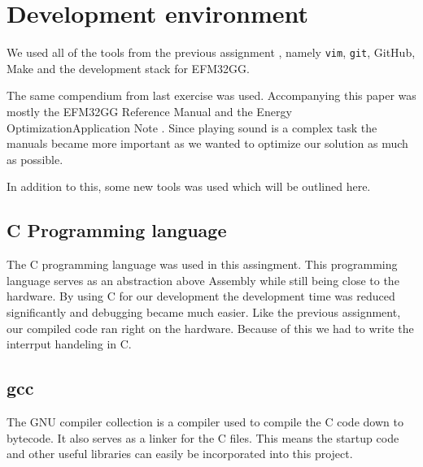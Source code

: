 \section{Development environment}
We used all of the tools from the previous assignment \cite{report-1}, namely \texttt{vim}, \texttt{git}, GitHub, Make and the development stack for EFM32GG.

The same compendium \cite{eeds-compendium} from last exercise was used.
Accompanying this paper was mostly the EFM32GG Reference Manual \cite{efm32gg-ref-man} and the Energy OptimizationApplication Note \cite{efm32gg-energy-op}.
Since playing sound is a complex task the manuals became more important as we wanted to optimize our solution as much as possible.

In addition to this, some new tools was used which will be outlined here.

\subsection{C Programming language}
The C programming language was used in this assingment.
This programming language serves as an abstraction above Assembly while still being close to the hardware.
By using C for our development the development time was reduced significantly and debugging became much easier.
Like the previous assignment, our compiled code ran right on the hardware.
Because of this we had to write the interrput handeling in C.

\subsection{gcc}
The GNU compiler collection is a compiler used to compile the C code down to bytecode.
It also serves as a linker for the C files. This means the startup code and other useful libraries can easily be incorporated into this project.
